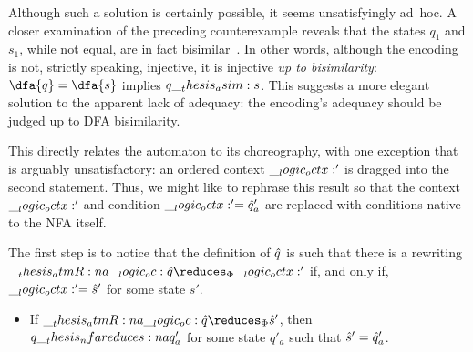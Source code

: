 Although such a solution is certainly possible, it seems unsatisfyingly ad~hoc.
A closer examination of the preceding counterexample reveals that the states $q_1$ and $s_1$, while not equal, are in fact bisimilar~.
In other words, although the encoding is not, strictly speaking, injective, it is injective \emph{up to bisimilarity}: $\dfa{q} = \dfa{s}$ implies $q \__thesis_asim: s$.
This suggests a more elegant solution to the apparent lack of adequacy: the encoding's adequacy should be judged up to \ac{DFA} bisimilarity.

This  directly relates the automaton to its choreography, with one exception that is arguably unsatisfactory: an ordered context $\__logic_octx:'$ is dragged into the second statement.
Thus, we might like to rephrase this result so that the context $\__logic_octx:'$ and condition $\__logic_octx:' = \hat{q}'_a$ are replaced with conditions native to the \ac{NFA} itself.

The first step is to notice that the definition of $\hat{q}$ is such that there is a rewriting $\atmR{a} \oc \defp{q} \reduces_{\orsig} \octx'$ if, and only if, $\__logic_octx:' = \hat{s}'$ for some state $s'$.
\begin{itemize}
\item
  If $\atmR{a} \oc \defp{q} \reduces_{\orsig} \defp{s}'$, then $q \nfareduces[a] q'_a$ for some state $q'_a$ such that $\hat{s}' = \hat{q}'_a$.
\end{itemize}

